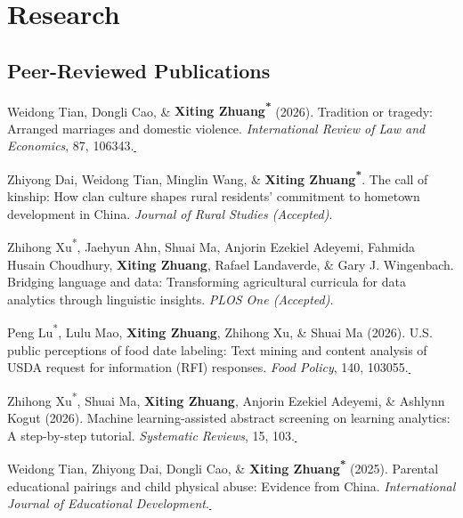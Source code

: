 \documentclass[10.8 pt,letterpaper]{article}
\newcommand{\corrauthor}{\textsuperscript{*}}
\newcommand{\paperlink}[1]{\href{#1}{\,\small\faExternalLink}}
\renewenvironment{itemize}{
	\begin{list}{}{
			\setlength{\leftmargin}{1.5em}
		}
	}{
	\end{list}
}
\begin{document}
	\section*{\textbf{Research}}
	
	\subsection*{\textbf{Peer-Reviewed Publications}}
	\begin{itemize}

		\item[-] Weidong Tian, Dongli Cao, \& \textbf{Xiting Zhuang\corrauthor} (2026). Tradition or tragedy: Arranged marriages and domestic violence. \textit{International Review of Law and Economics}, 87, 106343.\paperlink{https://doi.org/10.1016/j.irle.2026.106343}

		\item[-] Zhiyong Dai, Weidong Tian, Minglin Wang, \& \textbf{Xiting Zhuang\corrauthor}. The call of kinship: How clan culture shapes rural residents' commitment to hometown development in China. \emph{\textit{Journal of Rural Studies} (Accepted)}.

		\item[-] Zhihong Xu\corrauthor, Jaehyun Ahn, Shuai Ma, Anjorin Ezekiel Adeyemi, Fahmida Husain Choudhury, \textbf{Xiting Zhuang}, Rafael Landaverde, \& Gary J. Wingenbach. Bridging language and data: Transforming agricultural curricula for data analytics through linguistic insights. \emph{\textit{PLOS One} (Accepted)}.


		\item[-] Peng Lu\corrauthor, Lulu Mao, \textbf{Xiting Zhuang}, Zhihong Xu, \& Shuai Ma (2026). U.S. public perceptions of food date labeling: Text mining and content analysis of USDA request for information (RFI) responses. \textit{Food Policy}, 140, 103055.\paperlink{https://www.sciencedirect.com/science/article/abs/pii/S0306919226000229}
		
		\item[-] Zhihong Xu\corrauthor, Shuai Ma, \textbf{Xiting Zhuang}, Anjorin Ezekiel Adeyemi, \& Ashlynn Kogut (2026). 
		Machine learning-assisted abstract screening on learning analytics: A step-by-step tutorial. 
		\textit{Systematic Reviews}, 15, 103.\paperlink{https://doi.org/10.1186/s13643-026-03111-2}
		
		\item[-] Weidong Tian, Zhiyong Dai, Dongli Cao, \& \textbf{Xiting Zhuang\corrauthor} (2025). Parental educational pairings and child physical abuse: Evidence from China. \textit{International Journal of Educational Development}.\paperlink{https://doi.org/10.1016/j.ijedudev.2025.103449}
		

\end{itemize}
\end{document}
